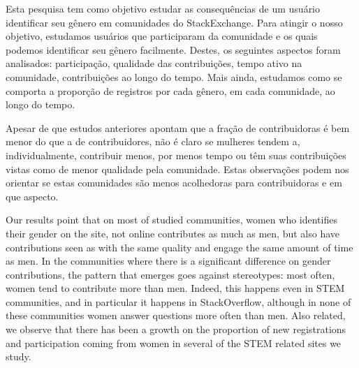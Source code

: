 Esta pesquisa tem como objetivo estudar as consequências de um usuário identificar seu gênero em comunidades do StackExchange. Para atingir o nosso objetivo, estudamos usuários que participaram da comunidade e os quais podemos identificar seu gênero facilmente. Destes, os seguintes aspectos foram analisados: participação, qualidade das contribuições, tempo ativo na comunidade, contribuições ao longo do tempo. Mais ainda, estudamos como se comporta a proporção de registros por cada gênero, em cada comunidade, ao longo do tempo.

Apesar de que estudos anteriores apontam que a fração de contribuidoras é bem menor do que a de contribuidores, não é claro se mulheres tendem a, individualmente, contribuir menos, por menos tempo ou têm suas contribuições vistas como de menor qualidade pela comunidade. Estas observações podem nos orientar se estas comunidades são menos acolhedoras para contribuidoras e em que aspecto.

Our results point that on most of studied communities, women who identifies their gender on the site, not online contributes as much as men, but also have contributions seen as with the same quality and engage the same amount of time as men. In the communities where there is a significant difference on gender contributions, the pattern that emerges goes against stereotypes: most often, women tend to contribute more than men. Indeed, this happens even in STEM communities, and in particular it happens in StackOverflow, although in none of these communities women answer questions more often than men.
Also related, we observe that there has been a growth on the proportion of new registrations and participation coming from women in several of the STEM related sites we study. 


